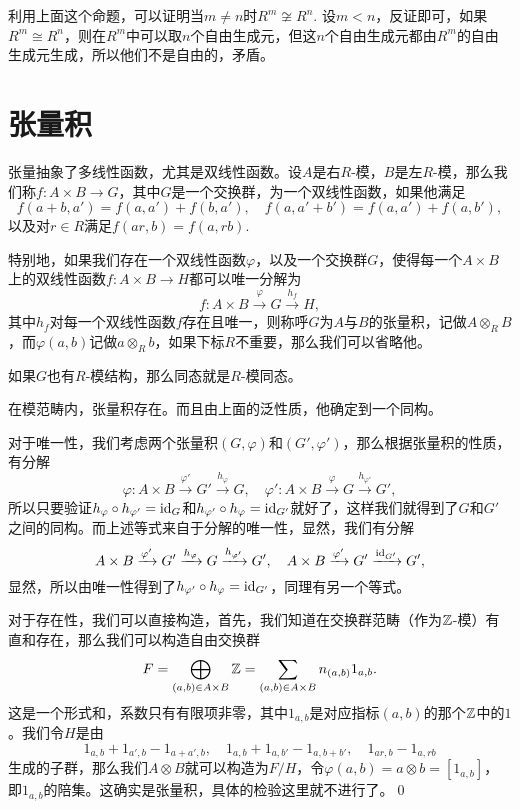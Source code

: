 利用上面这个命题，可以证明当$m\neq n$时$R^m\not\cong R^n$. 设$m<n$，反证即可，如果$R^m\cong R^n$，则在$R^m$中可以取$n$个自由生成元，但这$n$个自由生成元都由$R^m$的自由生成元生成，所以他们不是自由的，矛盾。

\section{张量积}

\para 张量抽象了多线性函数，尤其是双线性函数。设$A$是右$R$-模，$B$是左$R$-模，那么我们称$f:A\times B\to G$，其中$G$是一个交换群，为一个双线性函数，如果他满足
\[
	f(a+b,a')=f(a,a')+f(b,a'),\quad f(a,a'+b')=f(a,a')+f(a,b'),
\]
以及对$r\in R$满足$f(ar,b)=f(a,rb)$.

特别地，如果我们存在一个双线性函数$\varphi$，以及一个交换群$G$，使得每一个$A\times B$上的双线性函数$f:A\times B\to H$都可以唯一分解为
\[
	f:A\times B\xrightarrow{\varphi} G\xrightarrow{h_f}H,
\]
其中$h_f$对每一个双线性函数$f$存在且唯一，则称呼$G$为$A$与$B$的张量积，记做$A\otimes_R B$，而$\varphi(a,b)$记做$a\otimes_R b$，如果下标$R$不重要，那么我们可以省略他。

如果$G$也有$R$-模结构，那么同态就是$R$-模同态。

\lem 在模范畴内，张量积存在。而且由上面的泛性质，他确定到一个同构。

\proof 对于唯一性，我们考虑两个张量积$(G,\varphi)$和$(G',\varphi')$，那么根据张量积的性质，有分解
\[
	\varphi:A\times B\xrightarrow{\varphi'} G'\xrightarrow{h_{\varphi}}G,\quad \varphi':A\times B\xrightarrow{\varphi} G\xrightarrow{h_{\varphi'}}G',
\]
所以只要验证$h_\varphi\circ h_{\varphi'}=\operatorname{id}_{G}$和$h_{\varphi'}\circ h_{\varphi}=\operatorname{id}_{G'}$就好了，这样我们就得到了$G$和$G'$之间的同构。而上述等式来自于分解的唯一性，显然，我们有分解
\[
	A\times B\xrightarrow{\varphi'} G'\xrightarrow{h_{\varphi}}G\xrightarrow{h_{\varphi'}}G',\quad A\times B\xrightarrow{\varphi'} G'\xrightarrow{\operatorname{id}_{G'}}G',
\]
显然，所以由唯一性得到了$h_{\varphi'}\circ h_{\varphi}=\operatorname{id}_{G'}$，同理有另一个等式。

对于存在性，我们可以直接构造，首先，我们知道在交换群范畴（作为$\mathbb{Z}$-模）有直和存在，那么我们可以构造自由交换群
\[
	F=\bigoplus_{(a,b)\in A\times B} \mathbb{Z}=\sum_{(a,b)\in A\times B}n_{(a,b)}1_{a,b}.
\]
这是一个形式和，系数只有有限项非零，其中$1_{a,b}$是对应指标$(a,b)$的那个$\mathbb{Z}$中的$1$。我们令$H$是由
\[
	1_{a,b}+1_{a',b}-1_{a+a',b},\quad 1_{a,b}+1_{a,b'}-1_{a,b+b'},\quad 1_{ar,b}-1_{a,rb}
\]
生成的子群，那么我们$A\otimes B$就可以构造为$F/H$，令$\varphi(a,b)=a\otimes b=[1_{a,b}]$，即$1_{a,b}$的陪集。这确实是张量积，具体的检验这里就不进行了。\qed

